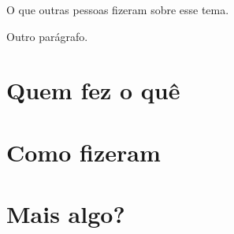 
O que outras pessoas fizeram sobre esse tema.

Outro parágrafo.

\section{Quem fez o quê}
\section{Como fizeram}
\section{Mais algo?}
